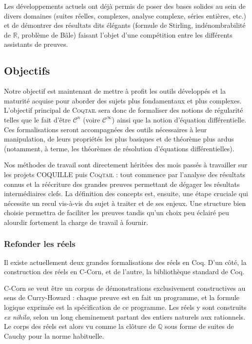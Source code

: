 \documentclass[11pt]{article}
\newcommand{\coqtail}{\textsc{Coqtail}}
\begin{document}
Les développements actuels ont déjà permis de poser des bases solides au sein de divers domaines (suites réelles, complexes, analyse complexe, séries entières, etc.) et de démontrer des résultats dits élégants (formule de Stirling, indénombrabilité de $\mathbb{R}$, problème de Bâle) faisant l'objet d'une compétition entre les différents assistants de preuves\cite{Freek}.


\subsection{Objectifs}

Notre objectif est maintenant de mettre à profit les outils développés et la maturité acquise pour aborder des sujets plus fondamentaux et plus complexes. L'objectif principal de \coqtail{} sera donc de formaliser des notions de régularité telles que le fait d'être $\mathcal{C}^n$ (voire $\mathcal{C}^\infty$) ainsi que la notion d'équation différentielle. Ces formalisations seront accompagnées des outils nécessaires à leur manipulation, de leurs propriétés les plus basiques et de théorème plus ardus (notamment, à terme, les théorèmes de résolution d'équations différentielles).

Nos méthodes de travail sont directement héritées des mois passés à travailler sur les projets COQUILLE puis \coqtail{} : tout commence par l'analyse des résultats connus et la réécriture des grandes preuves permettant de dégager les résultats intermédiaires clefs. La définition des concepts est, ensuite, une étape cruciale qui nécessite un recul vis-à-vis du sujet à traiter et de ses enjeux. Une structure bien choisie permettra de faciliter les preuves tandis qu'un choix peu éclairé peu alourdir fortement la charge de travail à fournir.

\subsubsection{Refonder les réels}

Il existe actuellement deux grandes formalisations des réels en Coq. D'un côté, la construction des réels en C-Corn, et de l'autre, la bibliothèque standard de Coq.

C-Corn se veut être un corpus de démonstrations exclusivement constructives au sens de Curry-Howard : chaque preuve est en fait un programme, et la formule logique exprimée est la spécification de ce programme. Les réels y sont construits \emph{ex nihilo}, selon un long cheminement partant des entiers naturels aux rationnels. Le corps des réels est alors vu comme la clôture de $\mathbb{Q}$ sous forme de suites de Cauchy pour la norme habituelle.
\end{document}

